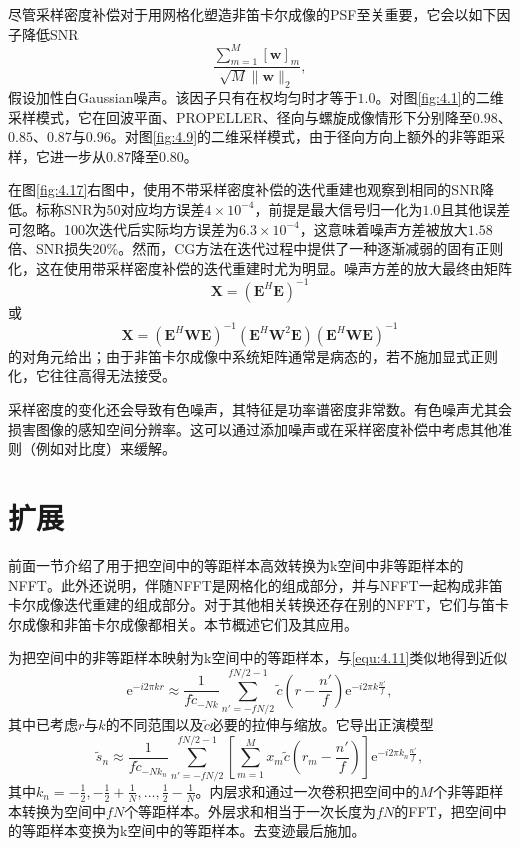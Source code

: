 \documentclass[12pt]{article}
\let\originallautoref\autoref
\renewcommand{\autoref}[1]{\allowbreak\originallautoref{#1}}
\begin{document}
尽管采样密度补偿对于用网格化塑造非笛卡尔成像的PSF至关重要，它会以如下因子降低SNR
\begin{equation}
    \frac{\sum_{m=1}^{M}[\bm{w}]_m}{\sqrt{M}\|\bm{w}\|_2},
    \label{equ:4.74}
\end{equation}
假设加性白Gaussian噪声。该因子只有在权均匀时才等于$1.0$。对图\autoref{fig:4.1}的二维采样模式，它在回波平面、PROPELLER、径向与螺旋成像情形下分别降至$0.98$、$0.85$、$0.87$与$0.96$。对图\autoref{fig:4.9}的二维采样模式，由于径向方向上额外的非等距采样，它进一步从$0.87$降至$0.80$。

在图\autoref{fig:4.17}右图中，使用不带采样密度补偿的迭代重建也观察到相同的SNR降低。标称SNR为50对应均方误差$4\times10^{-4}$，前提是最大信号归一化为$1.0$且其他误差可忽略。100次迭代后实际均方误差为$6.3\times10^{-4}$，这意味着噪声方差被放大$1.58$倍、SNR损失20\%。然而，CG方法在迭代过程中提供了一种逐渐减弱的固有正则化，这在使用带采样密度补偿的迭代重建时尤为明显。噪声方差的放大最终由矩阵
\begin{equation}
    \mathbf{X}=\left(\mathbf{E}^H\mathbf{E}\right)^{-1}
    \label{equ:4.75}
\end{equation}
或
\begin{equation}
    \mathbf{X}=\left(\mathbf{E}^H\mathbf{W}\mathbf{E}\right)^{-1}\left(\mathbf{E}^H\mathbf{W}^2\mathbf{E}\right)\left(\mathbf{E}^H\mathbf{W}\mathbf{E}\right)^{-1}
    \label{equ:4.76}
\end{equation}
的对角元给出；由于非笛卡尔成像中系统矩阵通常是病态的，若不施加显式正则化，它往往高得无法接受。

采样密度的变化还会导致有色噪声，其特征是功率谱密度非常数。有色噪声尤其会损害图像的感知空间分辨率。这可以通过添加噪声或在采样密度补偿中考虑其他准则（例如对比度）来缓解。

\section{扩展}
前面一节介绍了用于把空间中的等距样本高效转换为k空间中非等距样本的NFFT。此外还说明，伴随NFFT是网格化的组成部分，并与NFFT一起构成非笛卡尔成像迭代重建的组成部分。对于其他相关转换还存在别的NFFT，它们与笛卡尔成像和非笛卡尔成像都相关。本节概述它们及其应用。

为把空间中的非等距样本映射为k空间中的等距样本，与\autoref{equ:4.11}类似地得到近似
\begin{equation}
    \mathrm{e}^{-i2\pi kr}\approx\frac{1}{f\tilde{c}_{-Nk}}\sum_{n'=-fN/2}^{fN/2-1}\tilde{c}\left(r-\frac{n'}{f}\right)\mathrm{e}^{-i2\pi k\frac{n'}{f}},
    \label{equ:4.77}
\end{equation}
其中已考虑$r$与$k$的不同范围以及$\tilde{c}$必要的拉伸与缩放。它导出正演模型
\begin{equation}
    \tilde{s}_n\approx\frac{1}{f\tilde{c}_{-Nk_n}}\sum_{n'=-fN/2}^{fN/2-1}\left[\sum_{m=1}^{M}x_m\tilde{c}\left(r_m-\frac{n'}{f}\right)\right]\mathrm{e}^{-i2\pi k_n\frac{n'}{f}},
    \label{equ:4.78}
\end{equation}
其中$k_n=-\frac{1}{2},-\frac{1}{2}+\frac{1}{N},\ldots,\frac{1}{2}-\frac{1}{N}$。内层求和通过一次卷积把空间中的$M$个非等距样本转换为空间中$fN$个等距样本。外层求和相当于一次长度为$fN$的FFT，把空间中的等距样本变换为k空间中的等距样本。去变迹最后施加。
\end{document}
